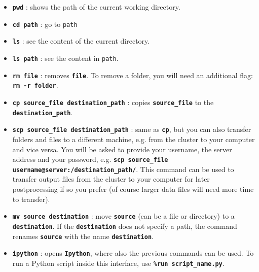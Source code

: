 \documentclass{article}
\newcommand{\commandline}[1]{\texttt{\textbf{#1}}}
\begin{document}
\begin{itemize}

\item{\commandline{pwd}} : shows the path of the current working directory.

\item \commandline{cd path} :  go to \texttt{path}

\item \commandline{ls} :  see the content of the current directory. 

\item \commandline{ls path} :  see the content in \texttt{path}.

\item \commandline{rm file} : removes \commandline{file}. To remove a folder, you will need an additional flag: \commandline{rm -r folder}.

\item \commandline{cp source\_file destination\_path} :  copies  \commandline{source\_file} to the \commandline{destination\_path}.

\item \commandline{scp source\_file destination\_path} :  same as \commandline{cp}, but you can also transfer folders and files to a different machine, e.g. from the cluster to your computer and vice versa. You will be asked to provide your username, the server address and your password, e.g. \commandline{scp source\_file username@server:/destination\_path/}. This command can be used to transfer output files from the cluster to your computer for later postprocessing if so you prefer (of course larger data files will need more time to transfer).

\item \commandline{mv source destination} : move \commandline{source} (can be a file or directory) to a \commandline{destination}. If the \commandline{destination} does not specify a path, the command renames \commandline{source} with the name \commandline{destination}.

\item \commandline{ipython} : opens \commandline{Ipython}, where also the previous commands can be used. To run a Python script inside this interface, use \commandline{\%run script\_name.py}.





\end{itemize}


 
\end{document}

